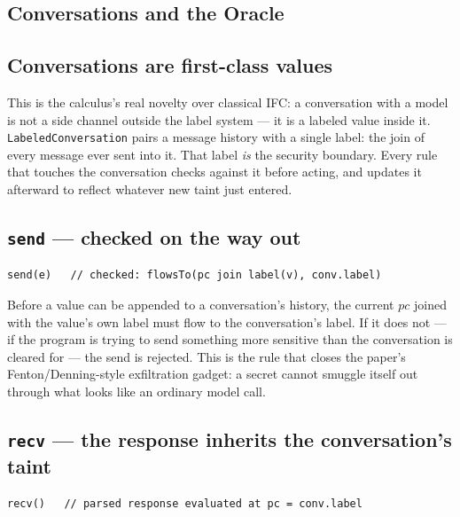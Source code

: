 \documentclass[11pt, a4paper]{article}
\begin{document}
\begin{descirption}
{%
\section{Conversations and the Oracle}

\subsection{Conversations are first-class values}

This is the calculus's real novelty over classical IFC: a conversation
with a model is not a side channel outside the label system --- it is a
labeled value inside it. \texttt{LabeledConversation} pairs a message
history with a single label: the join of every message ever sent into it.
That label \emph{is} the security boundary. Every rule that touches the
conversation checks against it before acting, and updates it afterward to
reflect whatever new taint just entered.

\subsection{\texttt{send} --- checked on the way out}

\begin{lstlisting}
send(e)   // checked: flowsTo(pc join label(v), conv.label)
\end{lstlisting}

Before a value can be appended to a conversation's history, the current
$pc$ joined with the value's own label must flow to the conversation's
label. If it does not --- if the program is trying to send something more
sensitive than the conversation is cleared for --- the send is rejected.
This is the rule that closes the paper's Fenton/Denning-style
exfiltration gadget: a secret cannot smuggle itself out through what looks
like an ordinary model call.

\subsection{\texttt{recv} --- the response inherits the conversation's taint}

\begin{lstlisting}
recv()   // parsed response evaluated at pc = conv.label
\end{lstlisting}

}
\end{descirption}
\end{document}
